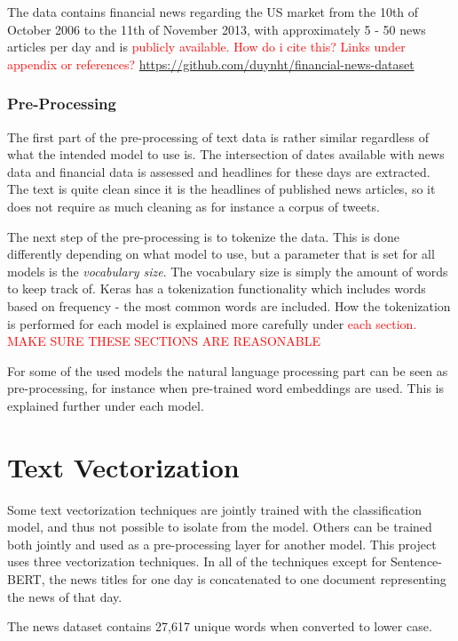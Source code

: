 The data contains financial news regarding the US market from the 10th of October 2006 to the 11th of November 2013, with approximately 5 - 50 news articles per day and is \textcolor{red}{publicly available. How do i cite this? Links under appendix or references? \url{https://github.com/duynht/financial-news-dataset}}

\subsubsection*{Pre-Processing}

The first part of the pre-processing of text data is rather similar regardless of what the intended model to use is. The intersection of dates available with news data and financial data is assessed and headlines for these days are extracted. The text is quite clean since it is the headlines of published news articles, so it does not require as much cleaning as for instance a corpus of tweets. 

The next step of the pre-processing is to tokenize the data. This is done differently depending on what model to use, but a parameter that is set for all models is the \textit{vocabulary size}. The vocabulary size is simply the amount of words to keep track of. Keras has a tokenization functionality which includes words based on frequency - the most common words are included. How the tokenization is performed for each model is explained more carefully under \textcolor{red}{each section. MAKE SURE THESE SECTIONS ARE REASONABLE} 

For some of the used models the natural language processing part can be seen as pre-processing, for instance when pre-trained word embeddings are used. This is explained further under each model.

\section{Text Vectorization}
Some text vectorization techniques are jointly trained with the classification model, and thus not possible to isolate from the model. Others can be trained both jointly and used as a pre-processing layer for another model. This project uses three vectorization techniques. In all of the techniques except for Sentence-BERT, the news titles for one day is concatenated to one document representing the news of that day. 

The news dataset contains 27,617 unique words when converted to lower case. 

